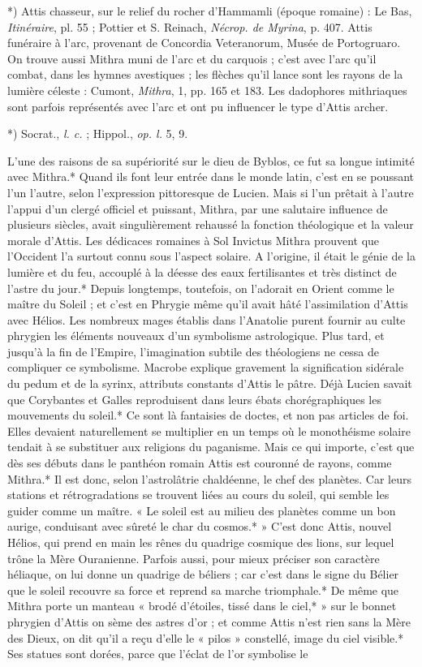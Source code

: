 \documentclass[a4paper, 11pt, oneside, polutonikogreek, french]{article}
\begin{document}
*) Attis chasseur, sur le relief du rocher d'Hammamli (époque romaine) : Le Bas, \emph{Itinéraire}, pl. 55 ; Pottier et S. Reinach, \emph{Nécrop. de Myrina}, p. 407. Attis funéraire à l'arc, provenant de Concordia Veteranorum, Musée de Portogruaro. On trouve aussi Mithra muni de l'arc et du carquois ; c'est avec l'arc qu'il combat, dans les hymnes avestiques ; les flèches qu'il lance sont les rayons de la lumière céleste : Cumont, \emph{Mithra}, 1, pp. 165 et 183. Les dadophores mithriaques sont parfois représentés avec l'arc et ont pu influencer le type d'Attis archer.

*) Socrat., \emph{l. c.} ; Hippol., \emph{op. l.} 5, 9.

L'une des raisons de sa supériorité sur le dieu de Byblos, ce fut sa longue intimité avec Mithra.* Quand ils font leur entrée dans le monde latin, c'est en se poussant l'un l'autre, selon l'expression pittoresque de Lucien. Mais si l'un prêtait à l'autre l'appui d'un clergé officiel et puissant, Mithra, par une salutaire influence de plusieurs siècles, avait singulièrement rehaussé la fonction théologique et la valeur morale d'Attis. Les dédicaces romaines à Sol Invictus Mithra prouvent que l'Occident l'a surtout connu sous l'aspect solaire. A l'origine, il était le génie de la lumière et du feu, accouplé à la déesse des eaux fertilisantes et très distinct de l'astre du jour.* Depuis longtemps, toutefois, on l'adorait en Orient comme le maître du Soleil ; et c'est en Phrygie même qu'il avait hâté l'assimilation d'Attis avec Hélios. Les nombreux mages établis dans l'Anatolie purent fournir au culte phrygien les éléments nouveaux d'un symbolisme astrologique. Plus tard, et jusqu'à la fin de l'Empire, l'imagination subtile des théologiens ne cessa de compliquer ce symbolisme. Macrobe explique gravement la signification sidérale du pedum et de la syrinx, attributs constants d'Attis le pâtre. Déjà Lucien savait que Corybantes et Galles reproduisent dans leurs ébats chorégraphiques les mouvements du soleil.* Ce sont là fantaisies de doctes, et non pas articles de foi. Elles devaient naturellement se multiplier en un temps où le monothéisme solaire tendait à se substituer aux religions du paganisme. Mais ce qui importe, c'est que dès ses débuts dans le panthéon romain Attis est couronné de rayons, comme Mithra.* Il est donc, selon l'astrolâtrie chaldéenne, le chef des planètes. Car leurs stations et rétrogradations se trouvent liées au cours du soleil, qui semble les guider comme un maître. « Le soleil est au milieu des planètes comme un bon aurige, conduisant avec sûreté le char du cosmos.* » C'est donc Attis, nouvel Hélios, qui prend en main les rênes du quadrige cosmique des lions, sur lequel trône la Mère Ouranienne. Parfois aussi, pour mieux préciser son caractère héliaque, on lui donne un quadrige de béliers ; car c'est dans le signe du Bélier que le soleil recouvre sa force et reprend sa marche triomphale.* De même que Mithra porte un manteau « brodé d'étoiles, tissé dans le ciel,* » sur le bonnet phrygien d'Attis on sème des astres d'or ; et comme Attis n'est rien sans la Mère des Dieux, on dit qu'il a reçu d'elle le « pilos » constellé, image du ciel visible.* Ses statues sont dorées, parce que l'éclat de l'or symbolise le 
\end{document}
